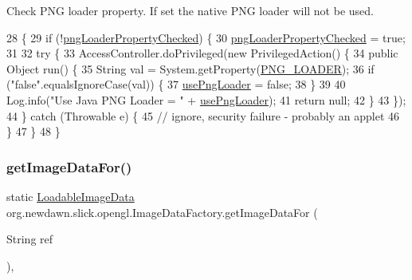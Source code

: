 Check P\+NG loader property. If set the native P\+NG loader will not be used. 
\begin{DoxyCode}
28                                         \{
29         \textcolor{keywordflow}{if} (!\mbox{\hyperlink{classorg_1_1newdawn_1_1slick_1_1opengl_1_1_image_data_factory_a0914d4737208dbff8b6b1bddc3054ed9}{pngLoaderPropertyChecked}}) \{
30             \mbox{\hyperlink{classorg_1_1newdawn_1_1slick_1_1opengl_1_1_image_data_factory_a0914d4737208dbff8b6b1bddc3054ed9}{pngLoaderPropertyChecked}} = \textcolor{keyword}{true};
31 
32             \textcolor{keywordflow}{try} \{
33                 AccessController.doPrivileged(\textcolor{keyword}{new} PrivilegedAction() \{
34                     \textcolor{keyword}{public} Object run() \{
35                         String val = System.getProperty(\mbox{\hyperlink{classorg_1_1newdawn_1_1slick_1_1opengl_1_1_image_data_factory_a2604900708ec909187ac502bccfaafa9}{PNG\_LOADER}});
36                         \textcolor{keywordflow}{if} (\textcolor{stringliteral}{"false"}.equalsIgnoreCase(val)) \{
37                             \mbox{\hyperlink{classorg_1_1newdawn_1_1slick_1_1opengl_1_1_image_data_factory_a75a99eb42388b269c695e0c078c65303}{usePngLoader}} = \textcolor{keyword}{false};
38                         \}
39                         
40                         Log.info(\textcolor{stringliteral}{"Use Java PNG Loader = "} + \mbox{\hyperlink{classorg_1_1newdawn_1_1slick_1_1opengl_1_1_image_data_factory_a75a99eb42388b269c695e0c078c65303}{usePngLoader}});
41                         \textcolor{keywordflow}{return} null;
42                     \}
43                 \});
44             \} \textcolor{keywordflow}{catch} (Throwable e) \{
45                 \textcolor{comment}{// ignore, security failure - probably an applet}
46             \}
47         \}
48     \}
\end{DoxyCode}
\mbox{\label{classorg_1_1newdawn_1_1slick_1_1opengl_1_1_image_data_factory_a76d9000037b8d8785c1f377d0f1d5bfb}} 
\subsubsection{\texorpdfstring{get\+Image\+Data\+For()}{getImageDataFor()}}
{\footnotesize\ttfamily static \mbox{\hyperlink{interfaceorg_1_1newdawn_1_1slick_1_1opengl_1_1_loadable_image_data}{Loadable\+Image\+Data}} org.\+newdawn.\+slick.\+opengl.\+Image\+Data\+Factory.\+get\+Image\+Data\+For (\begin{DoxyParamCaption}\item[{String}]{ref }\end{DoxyParamCaption})\hspace{0.3cm}{\ttfamily [inline]}, {\ttfamily [static]}}

